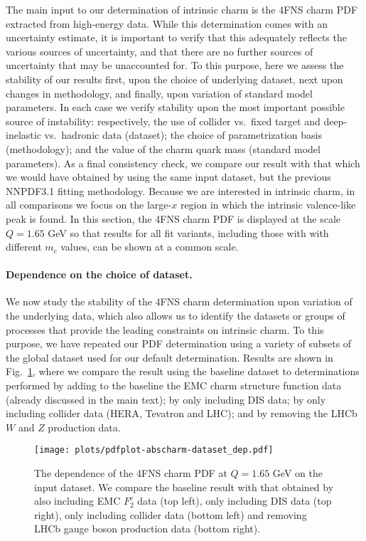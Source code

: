 The main input to our determination of intrinsic charm is the 4FNS
charm PDF extracted from high-energy data. While this
determination comes with an uncertainty estimate, it is important to
verify that this adequately reflects the various sources
of uncertainty, and that there are no further sources of uncertainty
that may be unaccounted for.
%
To this purpose, here we assess the
stability of our results first, upon the choice of underlying dataset,
next upon changes in methodology, and finally, upon variation of
standard model parameters.
%
In each case we verify stability upon the
most important possible source of instability: respectively, the use
of collider vs.\ fixed target and deep-inelastic vs.\ hadronic data
(dataset); the choice of parametrization basis (methodology); and the
value of the charm quark mass (standard model parameters).
%
As a final consistency check, we compare our result with that which we
would have obtained by using the same input dataset, but the previous
NNPDF3.1 fitting methodology.
%
Because we
are interested in intrinsic charm, in all comparisons we focus on
the large-$x$ region in which the intrinsic valence-like peak is found.
%
In this section, the 4FNS
charm PDF is displayed at the scale $Q = 1.65$ GeV so that
results for all fit variants, including
those with with different $m_c$ values, can be shown at a common scale.

\paragraph{Dependence on the choice of dataset.}
%
We now study the stability of the  4FNS charm determination upon
variation of the
underlying data, which also allows us to
identify the datasets or groups of processes that provide
the leading constraints on intrinsic charm.
%
To this purpose, we have repeated our PDF
determination using a  variety of subsets of the global dataset used for
our default determination. Results are shown in
Fig.~\ref{fig:ic/charm_dataset_dep}, where we compare the result using
the 
baseline dataset to determinations performed by adding to the baseline
the  EMC charm
structure function data (already discussed in the main text); by only
including  DIS data; by only including collider data (HERA,
Tevatron and LHC); and by removing the LHCb  $W$ and $Z$ production data.

\begin{figure}[t!]
  \begin{center}
    \texttt{[image: plots/pdfplot-abscharm-dataset\_dep.pdf]}
    \caption{\small The dependence of the 4FNS charm PDF at $Q=1.65$ GeV on
      the input dataset.
      We compare the
    baseline result with that obtained by also including 
      EMC $F_2^c$ data (top left), only including DIS data (top
    right), only including collider data (bottom left) and removing
    LHCb gauge boson production data (bottom right). 
  \label{fig:ic/charm_dataset_dep} }
\end{center}
\end{figure}

